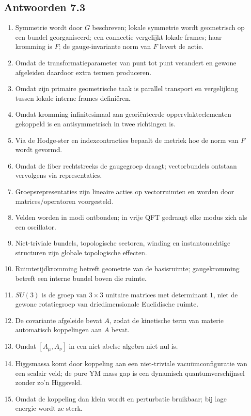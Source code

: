 \documentclass[11pt,a4paper]{article}
\begin{document}
\subsection*{Antwoorden 7.3}
\begin{enumerate}
\item Symmetrie wordt door $G$ beschreven; lokale symmetrie wordt geometrisch op een bundel georganiseerd; een connectie vergelijkt lokale frames; haar kromming is $F$; de gauge-invariante norm van $F$ levert de actie.
\item Omdat de transformatieparameter van punt tot punt verandert en gewone afgeleiden daardoor extra termen produceren.
\item Omdat zijn primaire geometrische taak is parallel transport en vergelijking tussen lokale interne frames definiëren.
\item Omdat kromming infinitesimaal aan georiënteerde oppervlakteelementen gekoppeld is en antisymmetrisch in twee richtingen is.
\item Via de Hodge-ster en indexcontracties bepaalt de metriek hoe de norm van $F$ wordt gevormd.
\item Omdat de fiber rechtstreeks de gaugegroep draagt; vectorbundels ontstaan vervolgens via representaties.
\item Groepsrepresentaties zijn lineaire acties op vectorruimten en worden door matrices/operatoren voorgesteld.
\item Velden worden in modi ontbonden; in vrije QFT gedraagt elke modus zich als een oscillator.
\item Niet-triviale bundels, topologische sectoren, winding en instantonachtige structuren zijn globale topologische effecten.
\item Ruimtetijdkromming betreft geometrie van de basisruimte; gaugekromming betreft een interne bundel boven die ruimte.
\item $SU(3)$ is de groep van $3\times3$ unitaire matrices met determinant $1$, niet de gewone rotatiegroep van driedimensionale Euclidische ruimte.
\item De covariante afgeleide bevat $A$, zodat de kinetische term van materie automatisch koppelingen aan $A$ bevat.
\item Omdat $[A_\mu,A_\nu]$ in een niet-abelse algebra niet nul is.
\item Higgsmassa komt door koppeling aan een niet-triviale vacuümconfiguratie van een scalair veld; de pure YM mass gap is een dynamisch quantumverschijnsel zonder zo'n Higgsveld.
\item Omdat de koppeling dan klein wordt en perturbatie bruikbaar; bij lage energie wordt ze sterk.

\end{enumerate}
\end{document}
